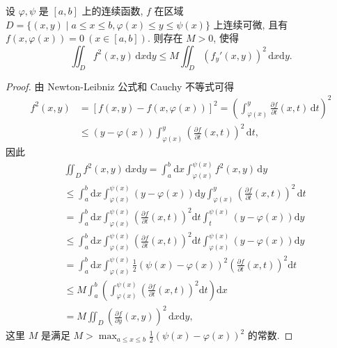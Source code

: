 \documentclass[../../main.tex]{subfiles}
\begin{document}
\begin{theorem}\label{theorem:Poincaré(庞加莱)不等式}
设 \(\varphi, \psi\) 是 \([a,b]\) 上的连续函数, \(f\) 在区域 \(D = \{(x,y) \mid a \leqslant x \leqslant b, \varphi(x) \leqslant y \leqslant \psi(x)\}\) 上连续可微, 且有 \(f(x, \varphi(x)) = 0\ (x \in [a,b])\). 则存在 \(M > 0\), 使得
\[
\iint_D f^2(x,y) \, \mathrm{d}x\mathrm{d}y \leqslant M \iint_D (f_y'(x,y))^2 \, \mathrm{d}x\mathrm{d}y.
\]
\end{theorem}
\begin{proof}
由 Newton-Leibniz 公式和 Cauchy 不等式可得
\begin{align*}
f^2(x,y)&=[f(x,y)-f(x,\varphi (x))]^2=\left( \int_{\varphi (x)}^y{\frac{\partial f}{\partial t}(x,t)\,\mathrm{d}t} \right) ^2
\\
&\leqslant (y-\varphi (x))\int_{\varphi (x)}^y{\left( \frac{\partial f}{\partial t}(x,t) \right) ^2\,\mathrm{d}t},
\end{align*}
因此
\begin{align*}
&\iint_D{f^2\left( x,y \right) \,\mathrm{d}x\mathrm{d}y}=\int_a^b{\mathrm{d}x}\int_{\varphi \left( x \right)}^{\psi \left( x \right)}{f^2\left( x,y \right) \,\mathrm{d}y}
\\
&\leqslant \int_a^b{\mathrm{d}x}\int_{\varphi \left( x \right)}^{\psi \left( x \right)}{\left( y-\varphi \left( x \right) \right) \mathrm{d}y}\int_{\varphi \left( x \right)}^y{\left( \frac{\partial f}{\partial t}\left( x,t \right) \right) ^2\,\mathrm{d}t}
\\
&=\int_a^b{\mathrm{d}x}\int_{\varphi \left( x \right)}^{\psi \left( x \right)}{\left( \frac{\partial f}{\partial t}\left( x,t \right) \right) ^2\mathrm{d}t}\int_t^{\psi \left( x \right)}{\left( y-\varphi \left( x \right) \right) \mathrm{d}y}
\\
&\leqslant \int_a^b{\mathrm{d}x}\int_{\varphi \left( x \right)}^{\psi \left( x \right)}{\left( \frac{\partial f}{\partial t}\left( x,t \right) \right) ^2\mathrm{d}t}\int_{\varphi \left( x \right)}^{\psi \left( x \right)}{\left( y-\varphi \left( x \right) \right) \mathrm{d}y}
\\
&=\int_a^b{\mathrm{d}x}\int_{\varphi \left( x \right)}^{\psi \left( x \right)}{\frac{1}{2}\left( \psi \left( x \right) -\varphi \left( x \right) \right) ^2\left( \frac{\partial f}{\partial t}\left( x,t \right) \right) ^2\mathrm{d}t}
\\
&\leqslant M\int_a^b{\left( \int_{\varphi \left( x \right)}^{\psi \left( x \right)}{\left( \frac{\partial f}{\partial t}\left( x,t \right) \right) ^2\mathrm{d}t} \right) \mathrm{d}x}
\\
&=M\iint_D{\left( \frac{\partial f}{\partial y}\left( x,y \right) \right) ^2\,\mathrm{d}x\mathrm{d}y},
\end{align*}
这里 \(M\) 是满足 \(M > \max_{a \leqslant x \leqslant b} \frac{1}{2} (\psi(x) - \varphi(x))^2\) 的常数.

\end{proof}
\end{document}
